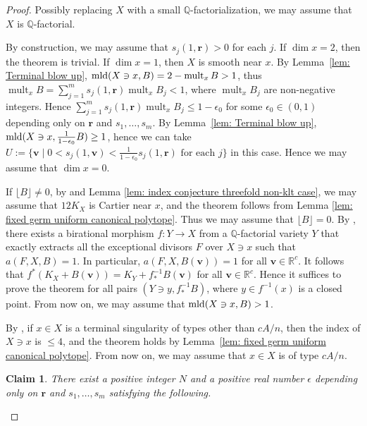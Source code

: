 \documentclass[11pt]{amsart}
\numberwithin{equation}{section}
\newcommand{\Qq}{\mathbb{Q}}
\newcommand{\Rr}{\mathbb{R}}
\newcommand{\mld}{{\rm{mld}}}
\newcommand{\ct}{\operatorname{ct}}
\newcommand{\mult}{\operatorname{mult}}
\newcommand{\Ii}{{\Gamma}}
\newtheorem{claim}[thm]{Claim}
\theoremstyle{definition}
\theoremstyle{definition}
\begin{document}
\begin{proof}
Possibly replacing $X$ with a small $\Qq$-factorialization, we may assume that $X$ is $\Qq$-factorial.

By construction, we may assume that $s_j(1,\bm r)>0$ for each $j$. If $\dim x=2$, then the theorem is trivial. If $\dim x=1$, then $X$ is smooth near $x$. By Lemma~\ref{lem: Terminal blow up}, $\mld(X\ni x, B)=2-\mult_x B> 1$, thus $\mult_x B=\sum_{j=1}^m s_j(1,\bm r)\mult_x B_j<1$, where $\mult_x B_j$ are non-negative integers. Hence $\sum_{j=1}^m s_j(1,\bm r)\mult_x B_j\leq 1-\epsilon_0$ for some $\epsilon_0\in(0,1)$ depending only on $\bm r$ and $s_1,\dots,s_m$. By Lemma~\ref{lem: Terminal blow up}, $\mld(X\ni x, \frac{1}{1-\epsilon_0} B)\geq 1$, hence we can take $U:=\{\bm v\mid 0<s_j(1,\bm v)< \frac{1}{1-\epsilon_0}s_j(1,\bm r)\text{ for each $j$}\}$ in this case. Hence we may assume that $\dim x=0$.

If $\lfloor B\rfloor\not=0$, by \cite[(6.1) Theorem]{Rei87} and Lemma \ref{lem: index conjecture threefold non-klt case}, we may assume that $12K_X$ is Cartier near $x$, and the theorem follows from Lemma \ref{lem: fixed germ uniform canonical polytope}. Thus we may assume that $\lfloor B \rfloor=0$. By \cite[Corollary~1.4.3]{BCHM10}, there exists a birational morphism $f: Y\to X$ from a $\Qq$-factorial variety $Y$ that exactly extracts all the exceptional divisors $F$ over $X\ni x$ such that $a(F,X,B)=1$. In particular, $a(F,X,B(\bm v))=1$ for all $\bm v\in \Rr^c$. It follows that $f^*(K_X+B(\bm v))=K_Y+f_*^{-1}B(\bm v)$ for all $\bm v\in \Rr^c$. Hence it suffices to prove the theorem for all pairs $(Y\ni y, f_*^{-1}B)$, where $y\in f^{-1}(x)$ is a closed point. From now on, we may assume that $\mld(X\ni x, B)>1$.

By \cite[(6.1) Theorem]{Rei87}, if $x\in X$ is a terminal singularity of types other than $cA/n$, then the index of $X\ni x$ is $\leq 4$, and the theorem holds by Lemma~\ref{lem: fixed germ uniform canonical polytope}. From now on, we may assume that $x\in X$ is of type $cA/n$. 




\begin{claim}\label{claim: ct lower bound to 1}
There exist a positive integer $N$ and a positive real number $\epsilon$ depending only on $\bm r$ and $s_1,\dots,s_m$ satisfying the following.


\end{claim}
\end{proof}
\end{document}

